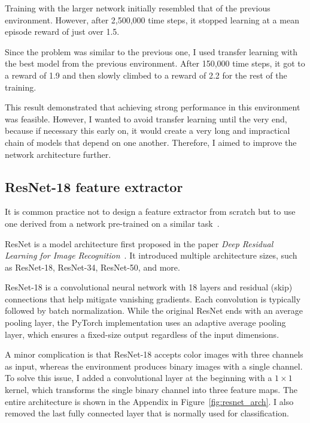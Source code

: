 \documentclass[
  digital,     %
  oneside,     %
  nosansbold,  %
  nocolorbold, %
  lof,         %
  lot,         %
]{fithesis4}
\begin{document}
Training with the larger network initially resembled that of the previous environment. However, after 2,500,000 time steps, it stopped learning at a mean episode reward of just over 1.5.

Since the problem was similar to the previous one, I used transfer learning with the best model from the previous environment. After 150,000 time steps, it got to a reward of 1.9 and then slowly climbed to a reward of 2.2 for the rest of the training.

This result demonstrated that achieving strong performance in this environment was feasible. However, I wanted to avoid transfer learning until the very end, because if necessary this early on, it would create a very long and impractical chain of models that depend on one another. Therefore, I aimed to improve the network architecture further.

\subsection{ResNet-18 feature extractor}
\label{subsec:resnet}

It is common practice not to design a feature extractor from scratch but to use one derived from a network pre-trained on a similar task~\cite{DLforVisualSystems}.

ResNet is a model architecture first proposed in the paper \textit{Deep Residual Learning for Image Recognition}~\cite{ResNet18}. It introduced multiple architecture sizes, such as ResNet-18, ResNet-34, ResNet-50, and more.

ResNet-18 is a convolutional neural network with 18 layers and residual (skip) connections that help mitigate vanishing gradients. Each convolution is typically followed by batch normalization. While the original ResNet ends with an average pooling layer, the PyTorch implementation uses an adaptive average pooling layer, which ensures a fixed-size output regardless of the input dimensions.

A minor complication is that ResNet-18 accepts color images with three channels as input, whereas the environment produces binary images with a single channel. To solve this issue, I added a convolutional layer at the beginning with a $1\times1$ kernel, which transforms the single binary channel into three feature maps. The entire architecture is shown in the Appendix in Figure~\ref{fig:resnet_arch}. I also removed the last fully connected layer that is normally used for classification.
\end{document}
